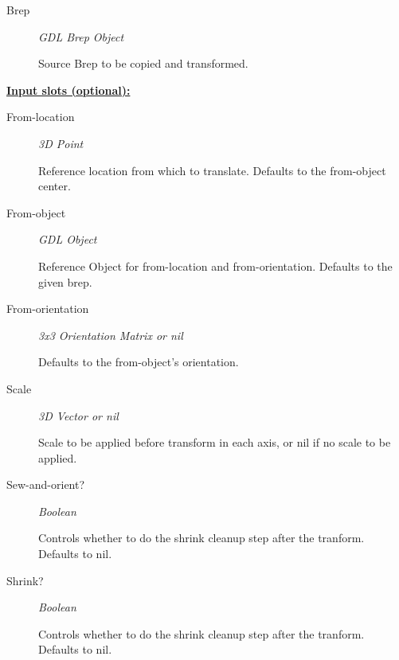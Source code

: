 \documentclass [11pt]{book}
\begin{document}
\begin{itemize}
\begin{description}

\item [Brep]
\emph{GDL Brep Object}

 Source Brep to be copied and transformed.




\end{description}






\textbf{
\underline{Input slots (optional):}}

\begin{description}

\item [From-location]
\emph{3D Point}

 Reference location from which to translate. Defaults to the from-object center.




\item [From-object]
\emph{GDL Object}

 Reference Object for from-location and from-orientation. Defaults to the given brep.




\item [From-orientation]
\emph{3x3 Orientation Matrix or nil}

 Defaults to the from-object's orientation.




\item [Scale]
\emph{3D Vector or nil}

 Scale to be applied before transform in each axis, or nil if no scale to be applied.




\item [Sew-and-orient?]
\emph{Boolean}

 Controls whether to do the shrink cleanup step after the tranform. Defaults to nil.




\item [Shrink?]
\emph{Boolean}

 Controls whether to do the shrink cleanup step after the tranform. Defaults to nil.





\end{description}
\end{itemize}
\end{document}
